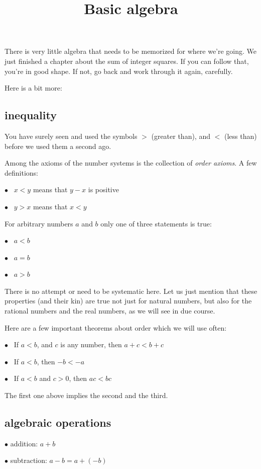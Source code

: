 \documentclass[11pt, oneside]{article}
\title{Basic algebra}
\date{}
\begin{document}
\maketitle
\Large

There is very little algebra that needs to be memorized for where we're going.  We just finished a chapter about the sum of integer squares.  If you can follow that, you're in good shape.  If not, go back and work through it again, carefully.

Here is a bit more:

\subsection*{inequality}
You have surely seen and used the symbols $>$ (greater than), and $<$ (less than) before we used them a second ago.

Among the axioms of the number systems is the collection of \emph{order axioms}.  A few definitions:

$\bullet$ \ $x < y$ means that $y - x$ is positive

$\bullet$ \ $y > x$ means that $x < y$

For arbitrary numbers $a$ and $b$ only one of three statements is true:  

$\bullet$ \ $a < b$

$\bullet$ \ $a = b$

$\bullet$ \ $a > b$

There is no attempt or need to be systematic here.  Let us just mention that these properties (and their kin) are true not just for natural numbers, but also for the rational numbers and the real numbers, as we will see in due course.  

Here are a few important theorems about order which we will use often:

$\bullet$ \ If $a < b$, and $c$ is any number, then $a + c < b + c$

$\bullet$ \ If $a < b$, then $-b < -a$

$\bullet$ \ If $a < b$ and $c > 0$, then $ac < bc$

The first one above implies the second and the third.

\subsection*{algebraic operations}

$\bullet$ addition:  $a + b$

$\bullet$ subtraction:  $a - b = a + (-b)$
\end{document}
